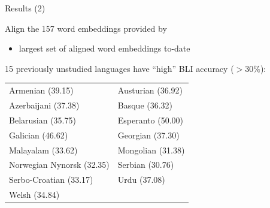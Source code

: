 \documentclass{beamer}
\begin{document}
\begin{frame}{Results (2)}

    Align the 157 word embeddings provided by \citet{grave2018learning} 
    \begin{itemize}
        \item largest set of aligned word embeddings to-date
    \end{itemize}

    \vspace{0.15in}
    15 previously unstudied languages have ``high'' BLI accuracy ($>30\%$):


    \renewcommand*{\arraystretch}{1.25}

    \vspace{0.15in}
    \begin{tabular}{ll}
        Armenian (39.15) &  Austurian (36.92) \\
        Azerbaijani (37.38) &  Basque (36.32) \\
        Belarusian (35.75) &  Esperanto (50.00) \\
        Galician (46.62) &  Georgian (37.30) \\
        Malayalam (33.62) & Mongolian (31.38) \\
        Norwegian Nynorsk (32.35) & Serbian (30.76) \\
        Serbo-Croatian (33.17) & Urdu (37.08) \\
        Welsh (34.84) \\

    \end{tabular}

\end{frame}
\end{document}
